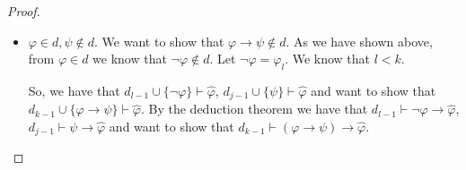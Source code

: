 \documentclass{article}
\theoremstyle{definition}
\theoremstyle{definition}
\theoremstyle{definition}
\theoremstyle{definition}
\theoremstyle{definition}
\newcommand*{\ra}{\rightarrow}
\newcommand{\PC}{$\mathsf{PC}$\xspace}
\begin{document}
\begin{proof}
\begin{itemize}
\begin{itemize}
                        Let us assume the opposite, that $d_{k-1} \cup \{\varphi \ra \psi\} \vdash
                            \hat{\varphi}$. By deduction theorem we have that $d_{k-1} \vdash (\varphi \ra
                            \psi) \ra \hat{\varphi}$.

                        Let $\Psi$ be a sequence we get by appending the proof of $\varphi \ra
                            \hat{\varphi}$ in $d_{k-1}$ and the proof of $\psi \ra \hat{\varphi}$ in
                        $d_{k-1}$ to the proof of $(\varphi \ra \psi) \ra \hat{\varphi}$ in $d_{k-1}$.
                        Then, let us append to $\Psi$ the formula $((\varphi \ra \psi) \ra
                            \hat{\varphi}) \ra ((\varphi \ra \hat{\varphi}) \ra ((\psi \ra \hat{\varphi})
                            \ra \hat{\varphi}))$, which is an instance of a \PC tautology $((\alpha \ra
                            \beta) \ra \gamma) \ra ( (\alpha \ra \gamma) \ra ((\beta \ra \gamma) \ra
                            \gamma))$. Then by \emph{modus ponens} we can infer $(\varphi \ra
                            \hat{\varphi}) \ra ((\psi \ra \hat{\varphi}) \ra \hat{\varphi})$, then we can
                        infer $(\psi \ra \hat{\varphi}) \ra \hat{\varphi}$ and finally we can infer
                        $\hat{\varphi}$ thus proving that $d_{k-1} \vdash \hat{\varphi}$ which is a
                        contradiction. So we know that $d_{k-1} \cup \{\varphi \ra \psi\} \not \vdash
                            \hat{\varphi}$ so $\varphi \ra \psi \in d$.
                  \item $\varphi \in d, \psi \not \in d$. We want to show that $\varphi \ra \psi \not \in d$. As we have shown above, from $\varphi \in d$ we know that $\lnot \varphi \not \in d$. Let $\lnot \varphi = \varphi_l$. We know that $l < k$.

                        So, we have that $d_{l-1} \cup \{\lnot \varphi\} \vdash \hat{\varphi}$,
                        $d_{j-1} \cup \{\psi\} \vdash \hat{\varphi}$ and want to show that $d_{k-1}
                            \cup \{\varphi \ra \psi\} \vdash \hat{\varphi}$. By the deduction theorem we
                        have that $d_{l-1} \vdash \lnot \varphi \ra \hat{\varphi}$, $d_{j-1} \vdash
                            \psi \ra \hat{\varphi}$ and want to show that $d_{k-1} \vdash (\varphi \ra
                            \psi) \ra \hat{\varphi}$.


\end{itemize}
\end{itemize}
\end{proof}
\end{document}
